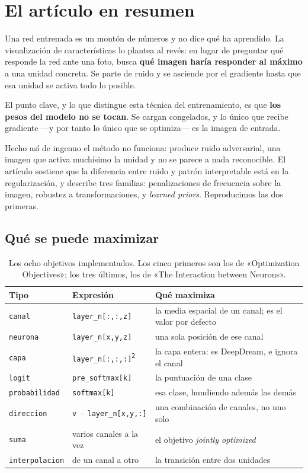 \documentclass[11pt,a4paper]{article}
\begin{document}
\section{El artículo en resumen}

Una red entrenada es un montón de números y no dice qué ha aprendido. La
visualización de características lo plantea al revés: en lugar de preguntar
qué responde la red ante una foto, busca \textbf{qué imagen haría responder
al máximo} a una unidad concreta. Se parte de ruido y se asciende por el
gradiente hasta que esa unidad se activa todo lo posible.

El punto clave, y lo que distingue esta técnica del entrenamiento, es que
\textbf{los pesos del modelo no se tocan}. Se cargan congelados, y lo único
que recibe gradiente —y por tanto lo único que se optimiza— es la imagen de
entrada.

Hecho así de ingenuo el método no funciona: produce ruido adversarial, una
imagen que activa muchísimo la unidad y no se parece a nada reconocible. El
artículo sostiene que la diferencia entre ruido y patrón interpretable está
en la regularización, y describe tres familias: penalizaciones de frecuencia
sobre la imagen, robustez a transformaciones, y \emph{learned priors}.
Reproducimos las dos primeras.

\subsection{Qué se puede maximizar}

\begin{table}[htb]
\centering\small
\caption{Los ocho objetivos implementados. Los cinco primeros son los de
«Optimization Objectives»; los tres últimos, los de «The Interaction between
Neurons».}
\begin{tabular}{l l L{7.6cm}}
\toprule
\textbf{Tipo} & \textbf{Expresión} & \textbf{Qué maximiza} \\
\midrule
\texttt{canal} & \texttt{layer\_n[:,:,z]} & la media espacial de un canal;
es el valor por defecto \\
\texttt{neurona} & \texttt{layer\_n[x,y,z]} & una sola posición de ese canal \\
\texttt{capa} & \texttt{layer\_n[:,:,:]\textsuperscript{2}} & la capa
entera: es DeepDream, e ignora el canal \\
\texttt{logit} & \texttt{pre\_softmax[k]} & la puntuación de una clase \\
\texttt{probabilidad} & \texttt{softmax[k]} & esa clase, hundiendo además
las demás \\
\texttt{direccion} & \texttt{v $\cdot$ layer\_n[x,y,:]} & una combinación de
canales, no uno solo \\
\texttt{suma} & varios canales a la vez & el objetivo \emph{jointly
optimized} \\
\texttt{interpolacion} & de un canal a otro & la transición entre dos
unidades \\
\bottomrule
\end{tabular}
\end{table}
\end{document}
